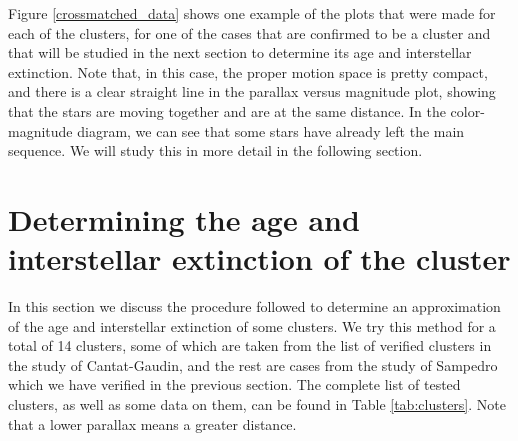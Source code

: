 \documentclass[twocolumn]{revtex4}
\begin{document}
Figure \ref{crossmatched_data} shows one example of the plots that were made for each of the clusters, for one of the cases that are confirmed to be a cluster and that will be studied in the next section to determine its age and interstellar extinction. Note that, in this case, the proper motion space is pretty compact, and there is a clear straight line in the parallax versus magnitude plot, showing that the stars are moving together and are at the same distance. In the color-magnitude diagram, we can see that some stars have already left the main sequence. We will study this in more detail in the following section.


\section{Determining the age and interstellar extinction of the cluster}
In this section we discuss the procedure followed to determine an approximation of the age and interstellar extinction of some clusters. We try this method for a total of 14 clusters, some of which are taken from the list of verified clusters in the study of Cantat-Gaudin, and the rest are cases from the study of Sampedro which we have verified in the previous section. The complete list of tested clusters, as well as some data on them, can be found in Table \ref{tab:clusters}. %
Note that a lower parallax means a greater distance.
\end{document}
